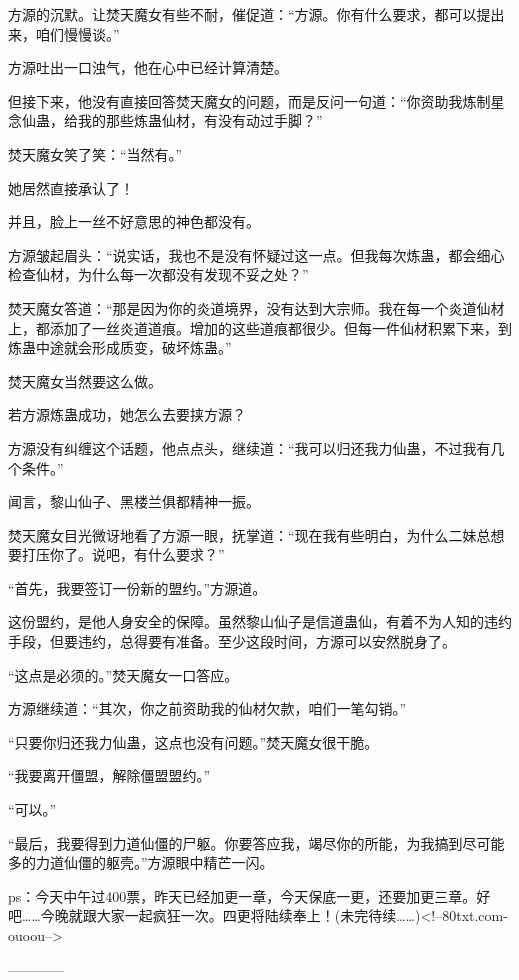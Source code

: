 \begin{this_body}
方源的沉默。让焚天魔女有些不耐，催促道：“方源。你有什么要求，都可以提出来，咱们慢慢谈。”

方源吐出一口浊气，他在心中已经计算清楚。

但接下来，他没有直接回答焚天魔女的问题，而是反问一句道：“你资助我炼制星念仙蛊，给我的那些炼蛊仙材，有没有动过手脚？”

焚天魔女笑了笑：“当然有。”

她居然直接承认了！

并且，脸上一丝不好意思的神色都没有。

方源皱起眉头：“说实话，我也不是没有怀疑过这一点。但我每次炼蛊，都会细心检查仙材，为什么每一次都没有发现不妥之处？”

焚天魔女答道：“那是因为你的炎道境界，没有达到大宗师。我在每一个炎道仙材上，都添加了一丝炎道道痕。增加的这些道痕都很少。但每一件仙材积累下来，到炼蛊中途就会形成质变，破坏炼蛊。”

焚天魔女当然要这么做。

若方源炼蛊成功，她怎么去要挟方源？

方源没有纠缠这个话题，他点点头，继续道：“我可以归还我力仙蛊，不过我有几个条件。”

闻言，黎山仙子、黑楼兰俱都精神一振。

焚天魔女目光微讶地看了方源一眼，抚掌道：“现在我有些明白，为什么二妹总想要打压你了。说吧，有什么要求？”

“首先，我要签订一份新的盟约。”方源道。

这份盟约，是他人身安全的保障。虽然黎山仙子是信道蛊仙，有着不为人知的违约手段，但要违约，总得要有准备。至少这段时间，方源可以安然脱身了。

“这点是必须的。”焚天魔女一口答应。

方源继续道：“其次，你之前资助我的仙材欠款，咱们一笔勾销。”

“只要你归还我力仙蛊，这点也没有问题。”焚天魔女很干脆。

“我要离开僵盟，解除僵盟盟约。”

“可以。”

“最后，我要得到力道仙僵的尸躯。你要答应我，竭尽你的所能，为我搞到尽可能多的力道仙僵的躯壳。”方源眼中精芒一闪。

ps：今天中午过400票，昨天已经加更一章，今天保底一更，还要加更三章。好吧……今晚就跟大家一起疯狂一次。四更将陆续奉上！(未完待续……)<!--80txt.com-ouoou-->

------------

\end{this_body}

